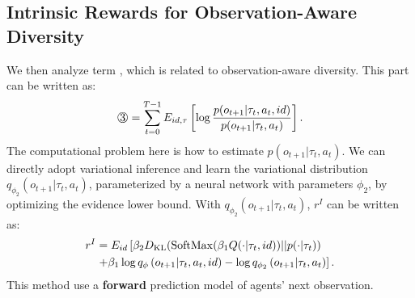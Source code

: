 


\subsection{Intrinsic Rewards for Observation-Aware Diversity}
We then analyze term , which is related to observation-aware diversity. This part can be written as:
\begin{equation}
\begin{aligned} 
\raisebox{.5pt}{\textcircled{\raisebox{-.9pt}{3}}}=\sum_{t=0}^{T-1}E_{i d, \tau} \left[\log \frac{p(o_{t+1}| \tau_t,a_t,id)}{p(o_{t+1}| \tau_t,a_t)}\right].
\end{aligned}
\end{equation}
The computational problem here is how to estimate $p\left(o_{t+1} | \tau_{t}, a_{t}\right)$. We can directly adopt variational inference and learn the variational distribution $q_{\phi_2}\left(o_{t+1} | \tau_{t}, a_{t}\right)$, parameterized by a neural network with parameters $\phi_2$, by optimizing the evidence lower bound. With $q_{\phi_2}\left(o_{t+1} | \tau_{t}, a_{t}\right)$, $r^{I}$ can be written as:
\begin{equation}
\begin{aligned} 
r^I &=  E_{id}\left[\beta_2 D_{\mathrm{KL}}({\rm SoftMax}(\beta_1 Q(\cdot | \tau_t, id)) || p(\cdot| \tau_t)) \right.
\\& \left.+ \beta_1 \log q_{\phi}\left(o_{t+1} | \tau_{t}, a_{t}, i d\right)-\log q_{\phi_2}\left(o_{t+1} | \tau_{t}, a_{t}\right)\right].
\end{aligned}
\label{final reward_forward}
\end{equation}
This method use a \textbf{forward} prediction model of agents' next observation.

